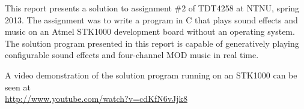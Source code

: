 This report presents a solution to assignment \#2 of TDT4258 at NTNU, spring 2013.
The assignment was to write a program in C that plays sound effects and music on an Atmel STK1000 development board without an operating system.
The solution program presented in this report is capable of generatively playing configurable sound effects and four-channel MOD music in real time.

\bigskip
\bigskip

\begin{center}
A video demonstration of the solution program running on an STK1000 can be seen at \\
\url{http://www.youtube.com/watch?v=cdKfN6vJjk8}
\end{center}
